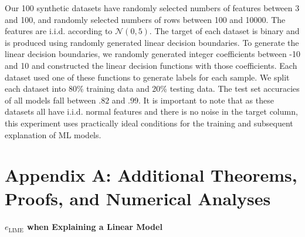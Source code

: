 \documentclass[mnsc,blindrev]{informs3}
\begin{document}
    Our 100 synthetic datasets have randomly selected numbers of features between 3 and 100, and randomly selected numbers of rows between 100 and 10000. The features are i.i.d. according to $\mathcal{N}(0,5)$. The target of each dataset is binary and is produced using randomly generated linear decision boundaries. To generate the linear decision boundaries, we randomly generated integer coefficients between -10 and 10 and  constructed the linear decision functions with those coefficients. Each dataset used one of these functions to generate labels for each sample.  %
    We split each dataset into 80\% training data and 20\% testing data.  The test set accuracies of all models fall between $.82$ and $.99$. It is important to note that as these datasets all have i.i.d. normal features and there is no noise in the target column, this experiment uses practically ideal conditions for the training and subsequent explanation of ML models.

    \section*{Appendix A: Additional Theorems, Proofs, and Numerical Analyses}  
        \label{apx_sec:proofs}    
        \paragraph{$e_{\text{LIME}}$ when Explaining a Linear Model}
            \label{sec:lime_linear_case}
             
\end{document}
